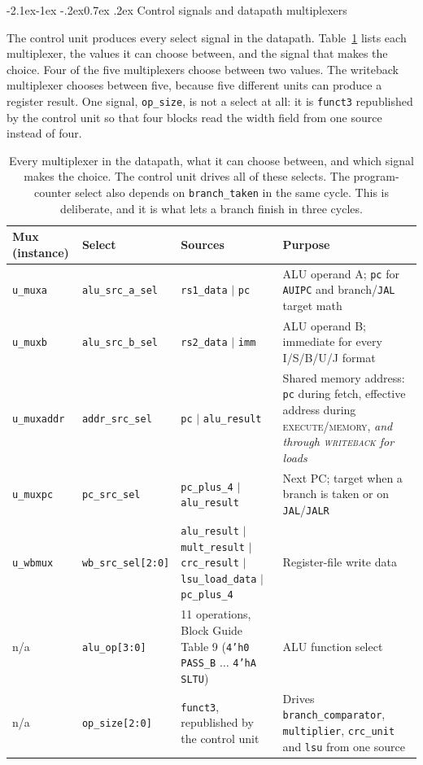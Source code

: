 \documentclass[11pt,a4paper]{article}
\makeatletter
\renewcommand\subsection{\@startsection{subsection}{2}{\z@}%
  {-2.1ex\@plus -1ex \@minus -.2ex}{0.7ex \@plus .2ex}%
  {\color{rvbldark}\normalfont\normalsize\bfseries}}
\newcommand{\hdr}[1]{\textbf{#1}}
\newcommand{\hrow}{\rowcolor{rvbltint}}
\makeatother
\begin{document}
\subsection{Control signals and datapath multiplexers}

The control unit produces every select signal in the datapath. Table~\ref{tab:mux} lists
each multiplexer, the values it can choose between, and the signal that makes the choice.
Four of the five multiplexers choose between two values. The writeback multiplexer chooses
between five, because five different units can produce a register result. One signal,
\texttt{op\_size}, is not a select at all: it is \texttt{funct3} republished by the control
unit so that four blocks read the width field from one source instead of four.

\begin{table}[htbp]
\centering\scriptsize
\caption{Every multiplexer in the datapath, what it can choose between, and which signal
makes the choice. The control unit drives all of these selects. The program-counter select
also depends on \texttt{branch\_taken} in the same cycle. This is deliberate, and it is what
lets a branch finish in three cycles.}
\label{tab:mux}
\setlength{\tabcolsep}{5pt}
\begin{tabularx}{\linewidth}{llXX}
\toprule
\hrow \hdr{Mux (instance)} & \hdr{Select} & \hdr{Sources} & \hdr{Purpose} \\
\midrule
\texttt{u\_muxa}    & \texttt{alu\_src\_a\_sel} & \texttt{rs1\_data} $\mid$ \texttt{pc} &
  ALU operand A; \texttt{pc} for \texttt{AUIPC} and branch/\texttt{JAL} target math \\
\texttt{u\_muxb}    & \texttt{alu\_src\_b\_sel} & \texttt{rs2\_data} $\mid$ \texttt{imm} &
  ALU operand B; immediate for every I/S/B/U/J format \\
\texttt{u\_muxaddr} & \texttt{addr\_src\_sel}   & \texttt{pc} $\mid$ \texttt{alu\_result} &
  Shared memory address: \texttt{pc} during fetch, effective address during
  \textsc{execute}/\textsc{memory}, \emph{and through \textsc{writeback} for loads} \\
\texttt{u\_muxpc}   & \texttt{pc\_src\_sel}     & \texttt{pc\_plus\_4} $\mid$
  \texttt{alu\_result} & Next PC; target when a branch is taken or on \texttt{JAL}/\texttt{JALR} \\
\texttt{u\_wbmux}   & \texttt{wb\_src\_sel[2:0]} & \texttt{alu\_result} $\mid$
  \texttt{mult\_result} $\mid$ \texttt{crc\_result} $\mid$ \texttt{lsu\_load\_data} $\mid$
  \texttt{pc\_plus\_4} & Register-file write data \\
n/a & \texttt{alu\_op[3:0]} & 11 operations, Block Guide Table 9 (\texttt{4'h0} \texttt{PASS\_B}
  $\ldots$ \texttt{4'hA} \texttt{SLTU}) & ALU function select \\
n/a & \texttt{op\_size[2:0]} & \texttt{funct3}, republished by the control unit & Drives
  \texttt{branch\_comparator}, \texttt{multiplier}, \texttt{crc\_unit} and \texttt{lsu}
  from one source \\
\bottomrule
\end{tabularx}
\end{table}
\end{document}
